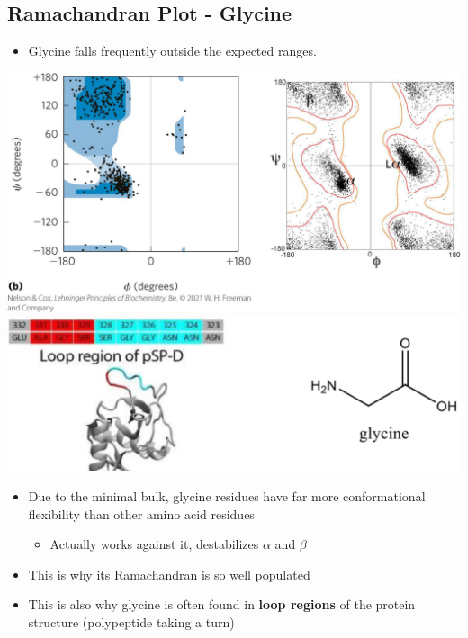 \documentclass[10pt]{article}
\begin{document}
\subsection*{Ramachandran Plot - Glycine}
\begin{itemize}
    \item Glycine falls frequently outside the expected ranges.
\end{itemize}
\begin{center}
    \includegraphics*[width=\textwidth]{L4_7.png}
    \includegraphics*[scale=0.7]{L4_8.png}
\end{center}
\begin{itemize}
    \item Due to the minimal bulk, glycine residues have far more conformational flexibility than other amino acid residues
    \begin{itemize}
        \item Actually works against it, destabilizes $\alpha$ and $\beta$
    \end{itemize}
    \item This is why its Ramachandran is so well populated
    \item This is also why glycine is often found in \textbf{loop regions} of the protein structure (polypeptide taking a turn)
\end{itemize}
\end{document}
